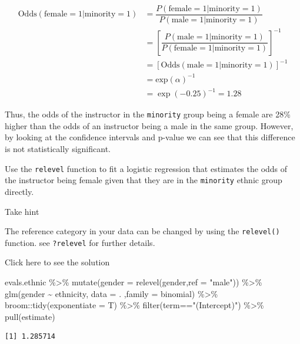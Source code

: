 \documentclass[
  letterpaper,
  DIV=11,
  numbers=noendperiod]{scrartcl}
\newenvironment{Shaded}{\begin{snugshade}}{\end{snugshade}}
\newcommand{\AttributeTok}[1]{\textcolor[rgb]{0.40,0.45,0.13}{#1}}
\newcommand{\FunctionTok}[1]{\textcolor[rgb]{0.28,0.35,0.67}{#1}}
\newcommand{\NormalTok}[1]{\textcolor[rgb]{0.00,0.23,0.31}{#1}}
\newcommand{\SpecialCharTok}[1]{\textcolor[rgb]{0.37,0.37,0.37}{#1}}
\newcommand{\StringTok}[1]{\textcolor[rgb]{0.13,0.47,0.30}{#1}}
\begin{document}
\begin{align}
\mathrm{Odds}(\mathrm{female} = 1 | \mathrm{minority} =1) &= \dfrac{P(\mathrm{female}=1 |\mathrm{minority}=1)}{P(\mathrm{male}= 1 |\mathrm{minority}=1)}\\
&= \left[\dfrac{P(\mathrm{male}=1 |\mathrm{minority}=1)}{P(\mathrm{female}= 1 |\mathrm{minority}=1)}\right]^{-1}\\
&= \left[\mathrm{Odds}(\mathrm{male}=1|\mathrm{minority}=1)\right]^{-1}\\
&= \mathrm{exp}(\alpha)^{-1} \\ &= \exp\left(-0.25\right)^{-1} = 1.28
\end{align}

Thus, the odds of the instructor in the \texttt{minority} group being a
female are 28\% higher than the odds of an instructor being a male in
the same group. However, by looking at the confidence intervals and
p-value we can see that this difference is not statistically
significant.

\begin{tcolorbox}[enhanced jigsaw, colframe=quarto-callout-warning-color-frame, toprule=.15mm, toptitle=1mm, opacitybacktitle=0.6, breakable, colback=white, opacityback=0, title={Task}, rightrule=.15mm, bottomrule=.15mm, coltitle=black, colbacktitle=quarto-callout-warning-color!10!white, leftrule=.75mm, left=2mm, arc=.35mm, bottomtitle=1mm, titlerule=0mm]

Use the \texttt{relevel} function to fit a logistic regression that
estimates the odds of the instructor being female given that they are in
the \texttt{minority} ethnic group directly.

Take hint

The reference category in your data can be changed by using the
\texttt{relevel()} function. see \texttt{?relevel} for further details.

Click here to see the solution

\begin{Shaded}
\begin{Highlighting}[]
\NormalTok{evals.ethnic }\SpecialCharTok{\%\textgreater{}\%}
  \FunctionTok{mutate}\NormalTok{(}\AttributeTok{gender =} \FunctionTok{relevel}\NormalTok{(gender,}\AttributeTok{ref =} \StringTok{"male"}\NormalTok{)) }\SpecialCharTok{\%\textgreater{}\%} 
  \FunctionTok{glm}\NormalTok{(gender }\SpecialCharTok{\textasciitilde{}}\NormalTok{ ethnicity, }\AttributeTok{data =}\NormalTok{ . ,}\AttributeTok{family =}\NormalTok{ binomial) }\SpecialCharTok{\%\textgreater{}\%} 
\NormalTok{  broom}\SpecialCharTok{::}\FunctionTok{tidy}\NormalTok{(}\AttributeTok{exponentiate =}\NormalTok{ T) }\SpecialCharTok{\%\textgreater{}\%} 
  \FunctionTok{filter}\NormalTok{(term}\SpecialCharTok{==}\StringTok{"(Intercept)"}\NormalTok{) }\SpecialCharTok{\%\textgreater{}\%}
  \FunctionTok{pull}\NormalTok{(estimate) }
\end{Highlighting}
\end{Shaded}

\begin{verbatim}
[1] 1.285714
\end{verbatim}

\end{tcolorbox}
\end{document}
